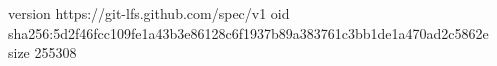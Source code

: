 version https://git-lfs.github.com/spec/v1
oid sha256:5d2f46fcc109fe1a43b3e86128c6f1937b89a383761c3bb1de1a470ad2c5862e
size 255308
